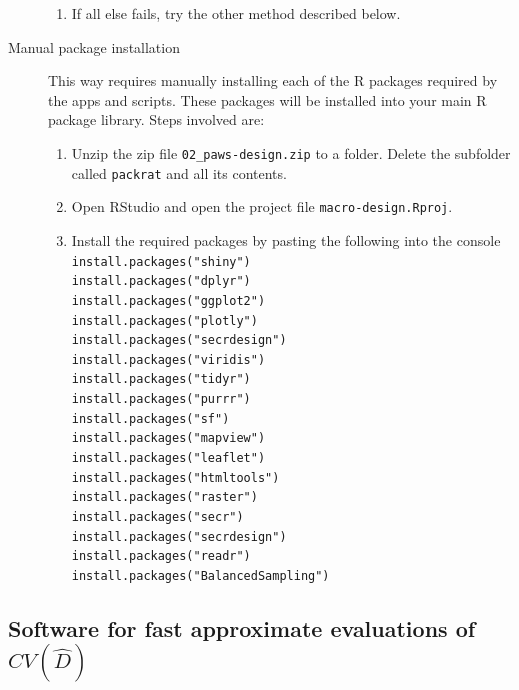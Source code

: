 \documentclass[a4paper,11pt]{article} %
\begin{document}
\begin{description}
\begin{enumerate}
\item If all else fails, try the other method described below.
\end{enumerate}
\item[Manual package installation] This way requires manually installing each of the R packages required by the apps and scripts. These packages will be installed into your main R package library. Steps involved are:
\begin{enumerate}
\item Unzip the zip file \verb!02_paws-design.zip! to a folder. Delete the subfolder called \texttt{packrat} and all its contents. 
\item Open RStudio and open the project file \texttt{macro-design.Rproj}.
\item Install the required packages by pasting the following into the console
\\[1em]
\texttt{install.packages("shiny")} \\
\texttt{install.packages("dplyr")} \\
\texttt{install.packages("ggplot2")} \\
\texttt{install.packages("plotly")} \\
\texttt{install.packages("secrdesign")} \\
\texttt{install.packages("viridis")} \\
\texttt{install.packages("tidyr")} \\
\texttt{install.packages("purrr")} \\
\texttt{install.packages("sf")} \\
\texttt{install.packages("mapview")} \\
\texttt{install.packages("leaflet")} \\
\texttt{install.packages("htmltools")} \\
\texttt{install.packages("raster")} \\
\texttt{install.packages("secr")} \\
\texttt{install.packages("secrdesign")} \\
\texttt{install.packages("readr")} \\
\texttt{install.packages("BalancedSampling")} 
\end{enumerate}
\end{description}

\subsection{Software for fast approximate evaluations of $CV(\hat{D})$}
\end{document}
